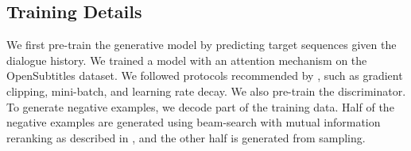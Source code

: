 \subsection{Training Details}
We first  pre-train the generative model by predicting target sequences given the dialogue history. We trained a  \sts model
  \cite{sutskever2014sequence}   
 with an attention mechanism \cite{bahdanau2014neural,luong2015effective}  on the OpenSubtitles dataset. 
 We followed protocols recommended by , such as gradient clipping, mini-batch, and learning rate decay.
We also pre-train the discriminator. To generate negative examples, 
we  decode   part of the training data. 
Half of the negative examples are generated using beam-search with mutual information reranking 
as described in ,
and the other half is generated from sampling. 




\begin{comment}
We add policy entropy $\nabla H(Y|X)$ to regularize the model  \cite{williams1991function,mnih2016asynchronous}. 
We also add an historical averaging term \cite{brown1951iterative,salimans2016improved} as a regularizer to smooth training:
 \begin{equation}
L= ||\theta-\frac{1}{t}\sum_{t}\theta_t ||^2
 \end{equation}
where $\theta_t$ denotes the value of the parameters at past time $t$. The historical average of the parameters is updated after each parameter update. 
\end{comment}

